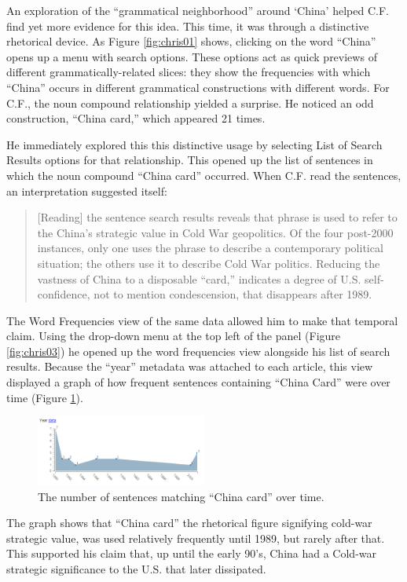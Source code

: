 \documentclass{sig-alternate}
\begin{document}
An exploration of the ``grammatical neighborhood'' around `China'  helped C.F. find yet more evidence for this idea. This time, it was through a distinctive rhetorical device. As Figure \ref{fig:chris01} shows, clicking on the word ``China'' opens up a menu with search options. These options act as quick previews of different grammatically-related slices: they show the frequencies with which ``China'' occurs in different grammatical constructions with different words.  For C.F., the noun compound relationship yielded a surprise. He noticed an odd construction, ``China card,'' which appeared 21 times.

He immediately explored this this distinctive usage by selecting List of Search Results options for that relationship.  This opened up the list of sentences in which the noun compound ``China card'' occurred.  When C.F. read the sentences, an interpretation suggested itself:
\begin{quote}
[Reading] the sentence search results reveals that phrase is used to refer to the China's strategic value in Cold War geopolitics. Of the four post-2000 instances, only one uses the phrase to describe a contemporary political situation; the others use it to describe Cold War politics. Reducing the vastness of China to a disposable ``card,'' indicates a degree of U.S. self-confidence, not to mention condescension, that disappears after 1989.
\end{quote}

The Word Frequencies view of the same data allowed him to make that temporal claim. Using the drop-down menu at the top left of the panel (Figure \ref{fig:chris03}) he opened up the word frequencies view alongside his list of search results.  Because the ``year'' metadata was attached to each article, this view displayed a graph of how frequent  sentences containing ``China Card'' were over time (Figure \ref{fig:chris02}). 
\begin{figure}[h!]
\includegraphics[width=0.5\textwidth]{fig/chris/02.png}
\caption{ The number of sentences matching ``China card'' over time. \label{fig:chris02}}
\end{figure}
The graph shows that ``China card'' the rhetorical figure signifying cold-war strategic value, was used relatively frequently until 1989, but rarely  after that. This supported his claim that, up until the early 90's, China had a Cold-war strategic significance to the U.S. that later dissipated.
\end{document}
